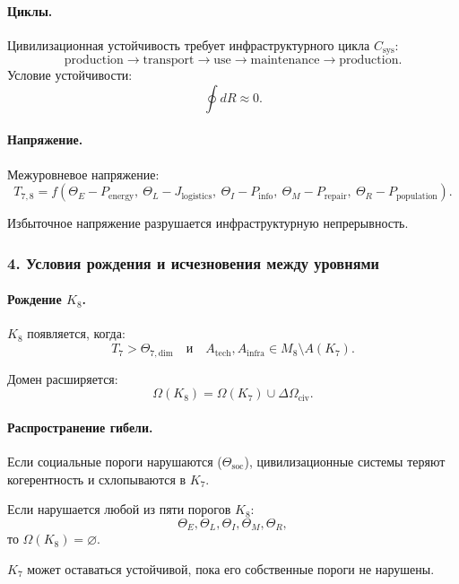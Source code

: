 \paragraph{Циклы.}
Цивилизационная устойчивость требует инфраструктурного цикла $C_{\mathrm{sys}}$:
\[
\text{production} \rightarrow \text{transport} \rightarrow
\text{use} \rightarrow \text{maintenance} \rightarrow \text{production}.
\]
Условие устойчивости:
\[
\oint dR \approx 0.
\]

\paragraph{Напряжение.}
Межуровневое напряжение:
\[
T_{7,8} =
f(\Theta_E - P_{\mathrm{energy}},\
  \Theta_L - J_{\mathrm{logistics}},\
  \Theta_I - P_{\mathrm{info}},\
  \Theta_M - P_{\mathrm{repair}},\
  \Theta_R - P_{\mathrm{population}}).
\]

Избыточное напряжение разрушается инфраструктурную непрерывность.

\subsubsection{4. Условия рождения и исчезновения между уровнями}

\paragraph{Рождение \texorpdfstring{$K_8$}{K_8}.}
$K_8$ появляется, когда:
\[
T_7 > \Theta_{7,\mathrm{dim}}
\quad\text{и}\quad
A_{\mathrm{tech}}, A_{\mathrm{infra}} \in M_8 \setminus A(K_7).
\]

Домен расширяется:
\[
\Omega(K_8) = \Omega(K_7) \cup \Delta\Omega_{\mathrm{civ}}.
\]

\paragraph{Распространение гибели.}
Если социальные пороги нарушаются ($\Theta_{\mathrm{soc}}$), цивилизационные
системы теряют когерентность и схлопываются в $K_7$.

Если нарушается любой из пяти порогов $K_8$:
\[
\Theta_E,\Theta_L,\Theta_I,\Theta_M,\Theta_R,
\]
то $\Omega(K_8)=\varnothing$.

$K_7$ может оставаться устойчивой, пока его собственные пороги не нарушены.

